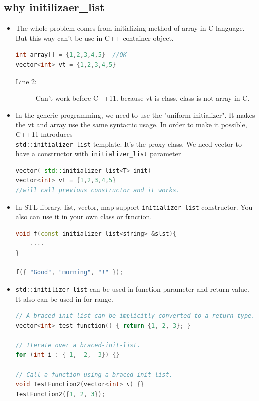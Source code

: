 \documentclass[a4paper,11pt,twoside]{book}
\begin{document}
\subsection{why initilizaer\_list}
\begin{itemize}
	\item The whole problem comes from initializing method of array in C language. But this way can't be use in C++ container object.
\begin{lstlisting}[frame=single, language=c++,mathescape=true]
int array[] = {1,2,3,4,5}  //OK 
vector<int> vt = {1,2,3,4,5} 
\end{lstlisting}
\begin{description}
	\item[Line 2:] Can't work before C++11. because vt is class, class is not array in C. 
\end{description}	
	
	\item In the generic programming, we need to use the "uniform initializer". It  makes the vt and array use the same syntactic usage. In order to make it possible, C++11 introduces \\ \texttt{std::initializer\_list} template. It's the proxy class. We need vector to have a constructor with \texttt{initializer\_list} parameter
\begin{lstlisting}[frame=single, language=c++,mathescape=true]
vector( std::initializer_list<T> init)
vector<int> vt = {1,2,3,4,5} 
//will call previous constructor and it works. 
\end{lstlisting}
	
	
	
	\item In STL library, list, vector, map support \texttt{initializer\_list} constructor. You also can use it in your own class or function.
\begin{lstlisting}[frame=single, language=c++,mathescape=true]
void f(const initializer_list<string> &slst){
	....
}
	
f({ "Good", "morning", "!" });
\end{lstlisting}
	
	\item \texttt{std::initilizer\_list} can be used in function parameter and return value. It also can be used in for range.  
\begin{lstlisting}[frame=single, language=c++,mathescape=true]
// A braced-init-list can be implicitly converted to a return type.
vector<int> test_function() { return {1, 2, 3}; }
	
// Iterate over a braced-init-list.
for (int i : {-1, -2, -3}) {}
	
// Call a function using a braced-init-list.
void TestFunction2(vector<int> v) {}
TestFunction2({1, 2, 3}); 
\end{lstlisting}

\end{itemize}
\end{document}
